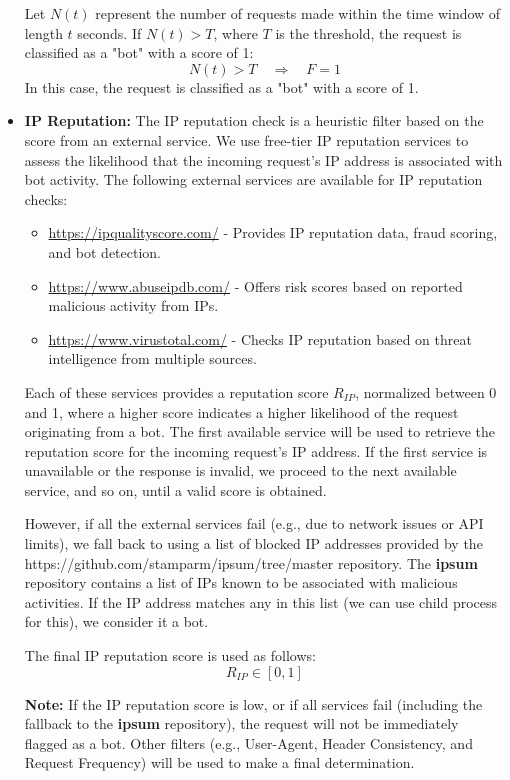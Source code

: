 \documentclass[12pt,a4paper]{article}
\begin{document}
\begin{itemize}
  Let \(N(t)\) represent the number of requests made within the time window of length \(t\) seconds. If \( N(t) > T \), where \(T\) is the threshold, the request is classified as a "bot" with a score of 1:
  \[
  N(t) > T \quad \Rightarrow \quad F = 1
  \]
  In this case, the request is classified as a "bot" with a score of 1.

\item \textbf{IP Reputation:} 
  The IP reputation check is a heuristic filter based on the score from an external service. We use free-tier IP reputation services to assess the likelihood that the incoming request’s IP address is associated with bot activity. The following external services are available for IP reputation checks:
  \begin{itemize}
    \item \url{https://ipqualityscore.com/} - Provides IP reputation data, fraud scoring, and bot detection.
    \item \url{https://www.abuseipdb.com/} - Offers risk scores based on reported malicious activity from IPs.
    \item \url{https://www.virustotal.com/} - Checks IP reputation based on threat intelligence from multiple sources.
  \end{itemize}
  
  Each of these services provides a reputation score \( R_{IP} \), normalized between 0 and 1, where a higher score indicates a higher likelihood of the request originating from a bot. The first available service will be used to retrieve the reputation score for the incoming request’s IP address. If the first service is unavailable or the response is invalid, we proceed to the next available service, and so on, until a valid score is obtained.

  However, if all the external services fail (e.g., due to network issues or API limits), we fall back to using a list of blocked IP addresses provided by the https://github.com/stamparm/ipsum/tree/master repository. The \textbf{ipsum} repository contains a list of IPs known to be associated with malicious activities. If the IP address matches any in this list (we can use child process for this), we consider it a bot.

  The final IP reputation score is used as follows:
  \[
  R_{IP} \in [0, 1]
  \]

  \textbf{Note:} If the IP reputation score is low, or if all services fail (including the fallback to the \textbf{ipsum} repository), the request will not be immediately flagged as a bot. Other filters (e.g., User-Agent, Header Consistency, and Request Frequency) will be used to make a final determination.
\end{itemize}
\end{document}
